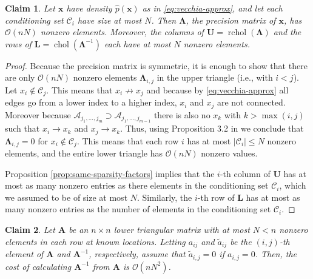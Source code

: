 \documentclass[12pt,letterpaper]{article}
\theoremstyle{propstyle}
\theoremstyle{propstyle}
\theoremstyle{propstyle}
\theoremstyle{propstyle}
\newtheorem{claim}{Claim}
\theoremstyle{propstyle}
\newcommand{\bx}{\mathbf{x}}
\newcommand{\bA}{\mathbf{A}}
\newcommand{\bL}{\mathbf{L}}
\newcommand{\bU}{\mathbf{U}}
\newcommand{\bfLambda}{\bm{\Lambda}}
\newcommand{\sx}{\mathcal{X}}
\newcommand{\sa}{\mathcal{A}}
\newcommand{\condset}{\mathcal{C}}
\newcommand{\im}{{i_1,\ldots,i_m}}
\newcommand{\jm}{{j_1,\ldots,j_m}}
\newcommand{\jmm}{{j_1,\ldots,j_{m-1}}}
\DeclareMathOperator*{\rchol}{rchol}
\DeclareMathOperator*{\chol}{chol}
\begin{document}
\begin{claim}
    Let $\bx$ have density $\hat{p}(\bx)$ as in \eqref{eq:vecchia-approx}, and let each conditioning set $\condset_i$ have size at most $N$. Then $\bfLambda$, the precision matrix of $\bx$, has $\mathcal{O}(nN)$ nonzero elements. Moreover, the columns of $\bU = \rchol(\bfLambda)$ and the rows of $\bL = \chol(\bfLambda^{-1})$ each have at most $N$ nonzero elements.
    \label{clm:nnz}
\end{claim}

\begin{proof}
    Because the precision matrix is symmetric, it is enough to show that there are only $\mathcal{O}(nN)$ nonzero elements $\bfLambda_{i,j}$ in the upper triangle (i.e., with $i<j$). Let $x_i \not\in \condset_j$. This means that $x_i \not\rightarrow x_j$ and because by \eqref{eq:vecchia-approx} all edges go from a lower index to a higher index, $x_i$ and $x_j$ are not connected. Moreover because $\sa_\jm \supset \sa_\jmm$ there is also no $x_k$ with $k>\max(i,j)$ such that $x_i \rightarrow x_k$ and $x_j \rightarrow x_k$. Thus, using Proposition 3.2 in \citet{Katzfuss2017a} we conclude that $\bfLambda_{i,j}=0$ for $x_i \not\in \condset_j$. This means that each row $i$ has at most $|\condset_i|\leq N$ nonzero elements, and the entire lower triangle has $\mathcal{O}(nN)$ nonzero values.

    Proposition \ref{prop:same-sparsity-factors} implies that the $i$-th column of $\bU$ has at most as many nonzero entries as there elements in the conditioning set $\condset_i$, which we assumed to be of size at most $N$. Similarly, the $i$-th row of $\bL$ has at most as many nonzero entries as the number of elements in the conditioning set $\condset_i$.
\end{proof}


\begin{claim}
    Let $\bA$ be an $n \times n$ lower triangular matrix with at most $N<n$ nonzero elements in each row at known locations. Letting $a_{ij}$ and $\tilde{a}_{ij}$ be the $(i,j)$-th element of $\bA$ and $\bA^{-1}$, respectively, assume that $\tilde{a}_{i,j}=0$ if $a_{i,j}=0$. Then, the cost of calculating $\bA^{-1}$ from $\bA$ is $\mathcal{O}(nN^2)$.
    \label{clm:triangular-sparse-inverse}
\end{claim}
\end{document}
